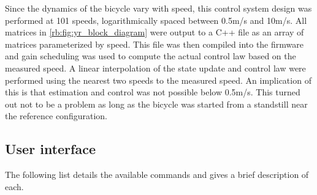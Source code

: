 Since the dynamics of the bicycle vary with speed, this control system design
was performed at 101 speeds, logarithmically spaced between 0.5m/s and 10m/s.
All matrices in \autoref{rb:fig:yr_block_diagram} were output to a C++ file as
an array of matrices parameterized by speed. This file was then compiled into
the firmware and gain scheduling was used to compute the actual control law
based on the measured speed. A linear interpolation of the state update and
control law were performed using the nearest two speeds to the measured speed.
An implication of this is that estimation and control was not possible below
0.5m/s. This turned out not to be a problem as long as the bicycle was started
from a standstill near the reference configuration.

\subsection{User interface} \label{rb:subsec:ui}
The following list details the available commands and gives a brief description
of each.

